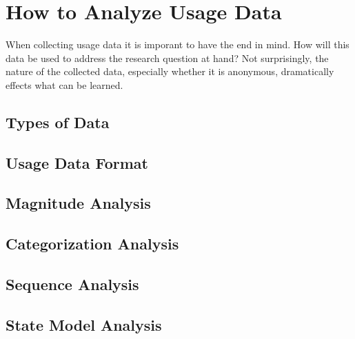 
\section{How to Analyze Usage Data}

When collecting usage data it is imporant to have the end in mind. How will this data be used to address the research question at hand? Not surprisingly, the nature of the collected data, especially whether it is anonymous, dramatically effects what can be learned.


\subsection{Types of Data}



\subsection{Usage Data Format}


\subsection{Magnitude Analysis}


\subsection{Categorization Analysis}


\subsection{Sequence Analysis}



\subsection{State Model Analysis}

